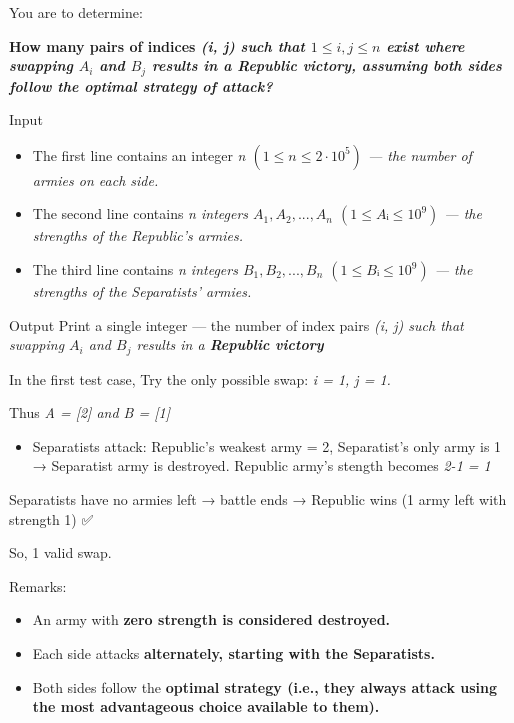 You are to determine:

\bf{How many pairs of indices} \it{(i, j)} such that $1\le i, j\le n$ exist where \bf{swapping} $A_i$ and $B_j$ \bf{results in a Republic victory}, assuming both sides follow the optimal strategy of attack?

\large{Input}
\begin{itemize}
\item The first line contains an integer \it{n} $ (1 \le n\le 2⋅10^5) $ — the number of armies on each side.
\item The second line contains \it{n} integers $A_1, A_2, ..., A_n$ $(1\le Aᵢ\le 10^9)$ — the strengths of the Republic's armies.
\item The third line contains \it{n} integers $B_1, B_2, ..., B_n$ $(1\le Bᵢ \le 10^9)$ — the strengths of the Separatists' armies.
\end{itemize}

\large{Output}
Print a single integer — the number of index pairs \it{(i, j)} such that swapping $A_i$ and $B_j$ results in a \bf{Republic victory}





In the first test case, Try the only possible swap: \it{i = 1, j = 1}.

Thus \it{A = [2]} and \it{B = [1]}
\begin{itemize}
\item Separatists attack:
Republic's weakest army = 2, Separatist's only army is 1 → Separatist army is destroyed.
Republic army's stength becomes \it{2-1 = 1}
\end{itemize}


Separatists have no armies left → battle ends → Republic wins (1 army left with strength 1) ✅

So, 1 valid swap.

Remarks:
\begin{itemize}
\item An army with \bf{zero} strength is considered destroyed.
\item Each side attacks \bf{alternately}, starting with the Separatists.
\item Both sides follow the \bf{optimal strategy} (i.e., they always attack using the most advantageous choice available to them).
\end{itemize}

